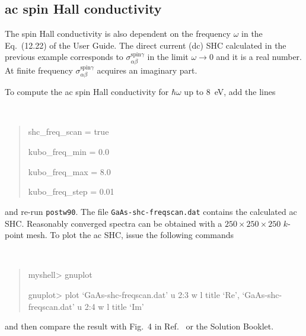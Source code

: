 \documentclass[a4paper,11pt,twoside]{article}
\begin{document}
\subsection*{ac spin Hall conductivity}

The spin Hall conductivity is also dependent on the 
frequency $\omega$ in the Eq.~(12.22) of the User Guide. 
The direct current (dc) SHC calculated in the previous example 
corresponds to $\sigma_{\alpha\beta}^{\text{spin}\gamma}$ in the limit $\omega\rightarrow
0$ and it is a real number. 
At finite frequency $\sigma_{\alpha\beta}^{\text{spin}\gamma}$ acquires an imaginary part.

To compute the ac spin Hall conductivity for $\hbar\omega$
up to 8~eV, 
add the lines
%
{\tt
	\begin{quote}
		shc\_freq\_scan = true
		
		kubo\_freq\_min = 0.0
		
		kubo\_freq\_max = 8.0
		
		kubo\_freq\_step = 0.01
\end{quote} }
%
and re-run {\tt postw90}. The file {\tt GaAs-shc-freqscan.dat} contains the calculated ac SHC. Reasonably converged spectra can be
obtained with a $250\times 250\times 250$ $k$-point mesh. 
To plot the ac SHC, issue the following commands {\tt
	\begin{quote}
		myshell> gnuplot
		
		gnuplot> plot `GaAs-shc-freqscan.dat' u 2:3 w l title `Re', `GaAs-shc-freqscan.dat' u 2:4 w l title `Im'
\end{quote} }
and then compare the result with Fig.~4 in
Ref.~\cite{qiao-prb2018} or the Solution Booklet. 
\end{document}
